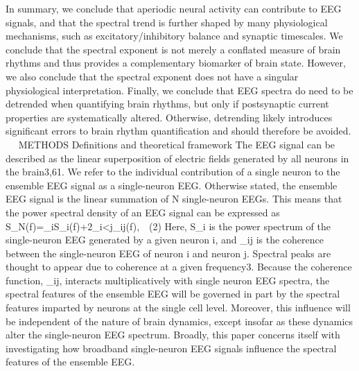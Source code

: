 In summary, we conclude that aperiodic neural activity can contribute to EEG signals, and that the spectral trend is further shaped by many physiological mechanisms, such as excitatory/inhibitory balance and synaptic timescales. We conclude that the spectral exponent is not merely a conflated measure of brain rhythms and thus provides a complementary biomarker of brain state. However, we also conclude that the spectral exponent does not have a singular physiological interpretation. Finally, we conclude that EEG spectra do need to be detrended when quantifying brain rhythms, but only if postsynaptic current properties are systematically altered. Otherwise, detrending likely introduces significant errors to brain rhythm quantification and should therefore be avoided.
 
METHODS
Definitions and theoretical framework
The EEG signal can be described as the linear superposition of electric fields generated by all neurons in the brain3,61. We refer to the individual contribution of a single neuron to the ensemble EEG signal as a single-neuron EEG. Otherwise stated, the ensemble EEG signal is the linear summation of N single-neuron EEGs. This means that the power spectral density of an EEG signal can be expressed as
S_N\left(f\right)=\sum_{i}{S_i(f)}+2\sum_{i<j}{\gamma_{ij}\left(f\right)},\ \ \left(2\right)
Here, S_i is the power spectrum of the single-neuron EEG generated by a given neuron i, and \gamma_{ij} is the coherence between the single-neuron EEG of neuron i and neuron j. Spectral peaks are thought to appear due to coherence at a given frequency3. Because the coherence function, \gamma_{ij}, interacts multiplicatively with single neuron EEG spectra, the spectral features of the ensemble EEG will be governed in part by the spectral features imparted by neurons at the single cell level. Moreover, this influence will be independent of the nature of brain dynamics, except insofar as these dynamics alter the single-neuron EEG spectrum. Broadly, this paper concerns itself with investigating how broadband single-neuron EEG signals influence the spectral features of the ensemble EEG. 

